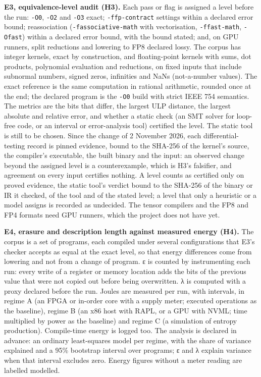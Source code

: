 \documentclass[10pt,letterpaper]{article}
\begin{document}
\textbf{E3, equivalence-level audit (H3).} Each pass or flag is assigned
a level before the run: \texttt{-O0}, \texttt{-O2} and \texttt{-O3}
exact; \texttt{-\allowbreak{}ffp-\allowbreak{}contract} settings within a declared error bound;
reassociation (\texttt{-\allowbreak{}fassociative-\allowbreak{}math} with vectorisation,
\texttt{-\allowbreak{}ffast-\allowbreak{}math}, \texttt{-Ofast}) within a declared error bound,
with the bound stated; and, on GPU runners, split reductions and
lowering to FP8 declared lossy. The corpus has integer kernels, exact by
construction, and floating-point kernels with sums, dot products,
polynomial evaluation and reductions, on fixed inputs that include
subnormal numbers, signed zeros, infinities and NaNs (not-a-number
values). The exact reference is the same computation in rational
arithmetic, rounded once at the end; the declared program is the
\texttt{-O0} build with strict IEEE 754 semantics. The metrics are the
bits that differ, the largest ULP distance, the largest absolute and
relative error, and whether a static check (an SMT solver for loop-free
code, or an interval or error-analysis tool) certified the level. The
static tool is still to be chosen. Since the change of 2 November 2026,
each differential-testing record is pinned evidence, bound to the
SHA-256 of the kernel's source, the compiler's executable, the built
binary and the input: an observed change beyond the assigned level is a
counterexample, which is H3's falsifier, and agreement on every input
certifies nothing. A level counts as certified only on proved evidence,
the static tool's verdict bound to the SHA-256 of the binary or IR it
checked, of the tool and of the stated level; a level that only a
heuristic or a model assigns is recorded as undecided. The tensor
compilers and the FP8 and FP4 formats need GPU runners, which the
project does not have yet.

\textbf{E4, erasure and description length against measured energy
(H4).} The corpus is a set of programs, each compiled under several
configurations that E3's checker accepts as equal at the exact level, so
that energy differences come from lowering and not from a change of
program. ε is counted by instrumenting each run: every write of a
register or memory location adds the bits of the previous value that
were not copied out before being overwritten. λ is computed with a proxy
declared before the run. Joules are measured per run, with intervals, in
regime A (an FPGA or in-order core with a supply meter; executed
operations as the baseline), regime B (an x86 host with RAPL, or a GPU
with NVML; time multiplied by power as the baseline) and regime C (a
simulation of entropy production). Compile-time energy is logged too.
The analysis is declared in advance: an ordinary least-squares model per
regime, with the share of variance explained and a 95\% bootstrap
interval over programs; ε and λ explain variance when that interval
excludes zero. Energy figures without a meter reading are labelled
modelled.
\end{document}
